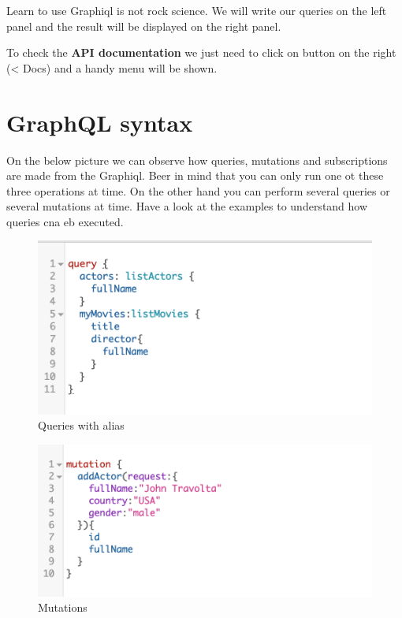 \documentclass[]{book}
\begin{document}
Learn to use Graphiql is not rock science. We will write our queries on
the left panel and the result will be displayed on the right panel.

To check the \textbf{API documentation} we just need to click on button
on the right (\textless{} Docs) and a handy menu will be shown.

\section{GraphQL syntax}\label{graphql-syntax}

On the below picture we can observe how queries, mutations and
subscriptions are made from the Graphiql. Beer in mind that you can only
run one ot these three operations at time. On the other hand you can
perform several queries or several mutations at time. Have a look at the
examples to understand how queries cna eb executed.

\begin{figure}
\centering
\includegraphics{assets/queries.png}
\caption{Queries with alias}
\end{figure}

\begin{figure}
\centering
\includegraphics{assets/mutations.png}
\caption{Mutations}
\end{figure}
\end{document}
